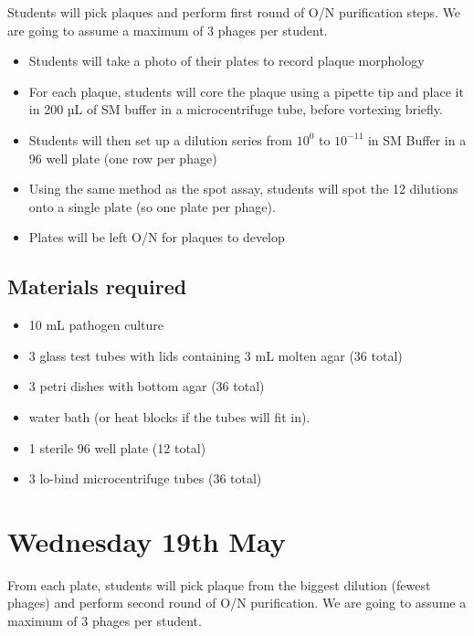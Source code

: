 \documentclass[
]{book}
\providecommand{\tightlist}{%
  \setlength{\itemsep}{0pt}\setlength{\parskip}{0pt}}
\begin{document}
Students will pick plaques and perform first round of O/N purification steps. We are going to assume a maximum of 3 phages per student.

\begin{itemize}
\tightlist
\item
  Students will take a photo of their plates to record plaque morphology
\item
  For each plaque, students will core the plaque using a pipette tip and place it in 200 µL of SM buffer in a microcentrifuge tube, before vortexing briefly.
\item
  Students will then set up a dilution series from \(10^{0}\) to \(10^{-11}\) in SM Buffer in a 96 well plate (one row per phage)
\item
  Using the same method as the spot assay, students will spot the 12 dilutions onto a single plate (so one plate per phage).
\item
  Plates will be left O/N for plaques to develop
\end{itemize}

\hypertarget{materials-required-1}{%
\subsection{Materials required}\label{materials-required-1}}

\begin{itemize}
\tightlist
\item
  10 mL pathogen culture
\item
  3 glass test tubes with lids containing 3 mL molten agar (36 total)
\item
  3 petri dishes with bottom agar (36 total)
\item
  water bath (or heat blocks if the tubes will fit in).
\item
  1 sterile 96 well plate (12 total)
\item
  3 lo-bind microcentrifuge tubes (36 total)
\end{itemize}

\hypertarget{wednesday-19th-may}{%
\section{Wednesday 19th May}\label{wednesday-19th-may}}

From each plate, students will pick plaque from the biggest dilution (fewest phages) and perform second round of O/N purification. We are going to assume a maximum of 3 phages per student.
\end{document}

